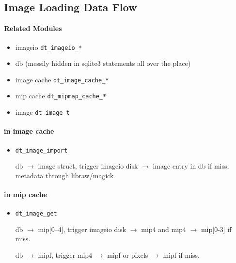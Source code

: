 \documentclass[a4paper,twoside]{scrartcl}
\newcommand{\code}[1]{\texttt{\color{codecol}#1}}
\begin{document}
\subsection{Image Loading Data Flow}

\paragraph{Related Modules}
\begin{itemize}
  \item imageio \code{dt\_imageio\_*}
  \item db (messily hidden in sqlite3 statements all over the place)
  \item image cache \code{dt\_image\_cache\_*}
  \item mip cache \code{dt\_mipmap\_cache\_*}
  \item image \code{dt\_image\_t}
\end{itemize}

\paragraph{in image cache}
\begin{itemize}
  \item \code{dt\_image\_import}

  db $\rightarrow$ image struct, trigger imageio disk $\rightarrow$ image entry in db if miss,
                metadata through libraw/magick
  
 
\end{itemize}

\paragraph{in mip cache}
\begin{itemize}
  \item \code{dt\_image\_get}

      db $\rightarrow$ mip[0--4], trigger imageio disk $\rightarrow$ mip4 and mip4 $\rightarrow$ mip[0-3] if miss.

  
      db $\rightarrow$ mipf, trigger mip4 $\rightarrow$ mipf or pixels $\rightarrow$ mipf if miss.
\end{itemize}
\end{document}
